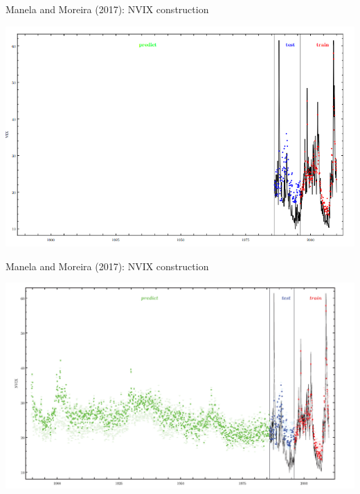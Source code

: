 \documentclass[english]{beamer}
\begin{document}
\begin{frame}{\small{Manela and Moreira (2017): NVIX construction}}
\vspace{-7pt}
\begin{center}
\includegraphics[scale=0.45]{Images/mm2017pre-3.png}
\end{center}
\end{frame}%

\begin{frame}{\small{Manela and Moreira (2017): NVIX construction}}
\vspace{-7pt}
\begin{center}
\includegraphics[scale=0.35]{Images/mm2017-1.png}
\end{center}
\end{frame}
\end{document}
